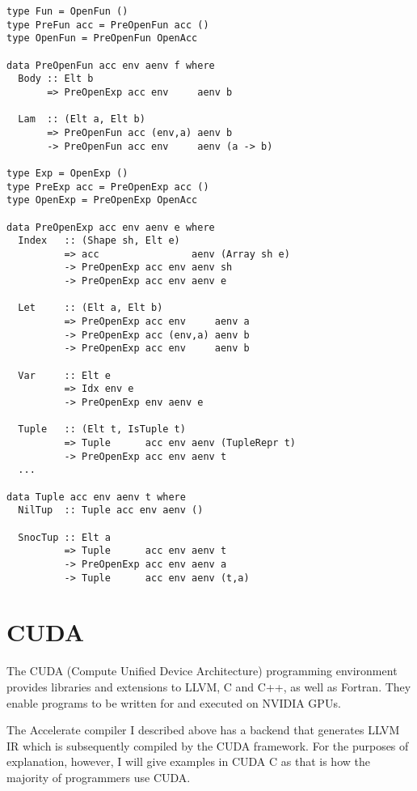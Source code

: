 \begin{lstlisting}[label=lst:exp-ast, caption={The first-order abstract syntax of the \texttt{Exp} level of Accelerate.}]
type Fun = OpenFun ()
type PreFun acc = PreOpenFun acc ()
type OpenFun = PreOpenFun OpenAcc

data PreOpenFun acc env aenv f where
  Body :: Elt b
       => PreOpenExp acc env     aenv b

  Lam  :: (Elt a, Elt b)
       => PreOpenFun acc (env,a) aenv b
       -> PreOpenFun acc env     aenv (a -> b)

type Exp = OpenExp ()
type PreExp acc = PreOpenExp acc ()
type OpenExp = PreOpenExp OpenAcc

data PreOpenExp acc env aenv e where
  Index   :: (Shape sh, Elt e)
          => acc                aenv (Array sh e)
          -> PreOpenExp acc env aenv sh
          -> PreOpenExp acc env aenv e

  Let     :: (Elt a, Elt b)
          => PreOpenExp acc env     aenv a
          -> PreOpenExp acc (env,a) aenv b
          -> PreOpenExp acc env     aenv b

  Var     :: Elt e
          => Idx env e
          -> PreOpenExp env aenv e

  Tuple   :: (Elt t, IsTuple t)
          => Tuple      acc env aenv (TupleRepr t)
          -> PreOpenExp acc env aenv t
  ...

data Tuple acc env aenv t where
  NilTup  :: Tuple acc env aenv ()

  SnocTup :: Elt a
          => Tuple      acc env aenv t
          -> PreOpenExp acc env aenv a
          -> Tuple      acc env aenv (t,a)
\end{lstlisting}
%

\section{CUDA}
\label{sec:cuda}

The CUDA (Compute Unified Device Architecture)\cite{cuda} programming environment provides libraries and extensions to LLVM, C and C++, as well as Fortran. They enable programs to be written for and executed on NVIDIA GPUs.

The Accelerate compiler I described above has a backend that generates LLVM IR which is subsequently compiled by the CUDA framework. For the purposes of explanation, however, I will give examples in CUDA C as that is how the majority of programmers use CUDA.


